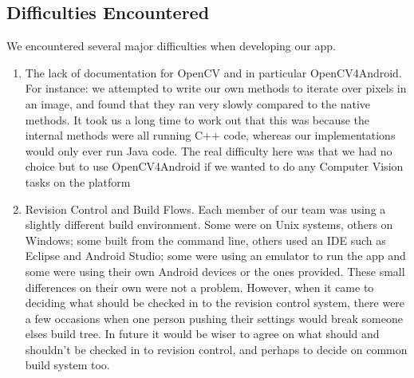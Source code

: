     \subsection{Difficulties Encountered}
    We encountered several major difficulties when developing our app.
    \begin{enumerate}
        \item{The lack of documentation for OpenCV and in particular OpenCV4Android. For instance: we attempted to write our own methods to iterate over pixels in an image, and found that they ran very slowly compared to the native methods. It took us a long time to work out that this was because the internal methods were all running C++ code, whereas our implementations would only ever run Java code. The real difficulty here was that we had no choice but to use
            OpenCV4Android if we wanted to do any Computer Vision tasks on the platform}
    \item{Revision Control and Build Flows. Each member of our team was using a slightly different build environment. Some were on Unix systems, others on Windows; some built from the command line, others used an IDE such as Eclipse and Android Studio; some were using an emulator to run the app and some were using their own Android devices or the ones provided. These small differences on their own were not a problem. However, when it came to deciding what should be checked in
            to the revision control system, there were a few occasions when one person pushing their settings would break someone elses build tree. In future it would be wiser to agree on what should and shouldn't be checked in to revision control, and perhaps to decide on common build system too.} 



    \end{enumerate}


